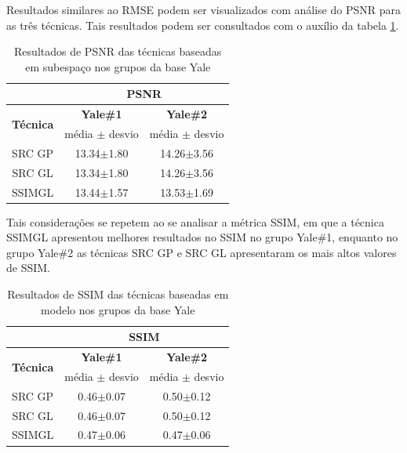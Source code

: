 Resultados similares ao RMSE podem ser visualizados com análise do PSNR para as três técnicas. Tais resultados podem ser consultados com o auxílio da tabela \ref{tab:PSNR_modelo_Yale}.


\begin{table}[H]
\caption{Resultados de PSNR das técnicas baseadas em subespaço nos grupos da base Yale}
\centering
\begin{tabular}{|c|c|c|}
\cline{2-3}
 \multicolumn{1}{c|}{} & \multicolumn{2}{c|}{\textbf{PSNR}}\\ \hline
\multicolumn{1}{|c|}{\multirow{2}{*}{\textbf{Técnica} }}& \textbf{Yale\#1} &  \textbf{Yale\#2}   \\ \cline{2-3}

& média $\pm$ desvio & média $\pm$ desvio \\\hline 
SRC GP&	13.34$\pm$1.80&	14.26$\pm$3.56\\\hline
SRC GL&	13.34$\pm$1.80&	14.26$\pm$3.56\\\hline
SSIMGL&	13.44$\pm$1.57&	13.53$\pm$1.69\\\hline
\end{tabular}
\label{tab:PSNR_modelo_Yale}
\end{table}


Tais  considerações se repetem ao se analisar a métrica SSIM, em que a técnica SSIMGL apresentou melhores resultados no SSIM no grupo Yale\#1, enquanto no grupo Yale\#2 as técnicas SRC GP e SRC GL apresentaram os mais altos valores de SSIM. 

\begin{table}[H]
\caption{Resultados de SSIM das técnicas baseadas em modelo nos grupos da base Yale}
\centering
\begin{tabular}{|c|c|c|}
\cline{2-3}
 \multicolumn{1}{c|}{} & \multicolumn{2}{c|}{\textbf{SSIM}}\\ \hline
\multicolumn{1}{|c|}{\multirow{2}{*}{\textbf{Técnica} }}& \textbf{Yale\#1} &  \textbf{Yale\#2}   \\ \cline{2-3}

& média $\pm$ desvio & média $\pm$ desvio \\\hline 
SRC GP	&0.46$\pm$0.07	&0.50$\pm$0.12\\\hline
SRC GL  &0.46$\pm$0.07	&0.50$\pm$0.12\\\hline
SSIMGL  &0.47$\pm$0.06	&0.47$\pm$0.06\\\hline
\end{tabular}
\label{tab:SSIM_modelo_Yale}
\end{table}


